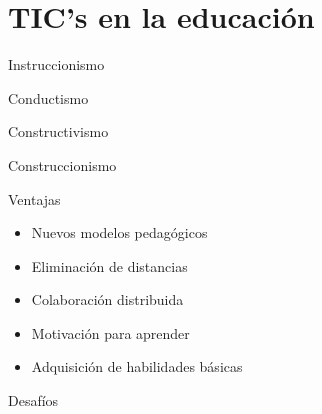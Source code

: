 \section{TIC's en la educación}
\setcounter{sectiontotal}{3}


\begin{frame}{Instruccionismo}
\end{frame}
\begin{frame}{Conductismo}
\end{frame}
\begin{frame}{Constructivismo}
\end{frame}
\begin{frame}{Construccionismo}
\end{frame}

\begin{frame}{Ventajas}
    \begin{itemize}[<+->]
        \item Nuevos modelos pedagógicos
        \item Eliminación de distancias
        \item Colaboración distribuida
        \item Motivación para aprender
        \item Adquisición de habilidades básicas
    \end{itemize}
\end{frame}
\begin{frame}{Desafíos}
\end{frame}
